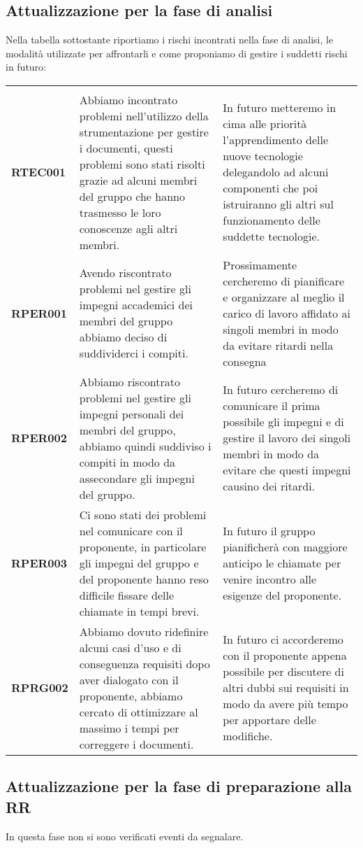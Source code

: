 \documentclass[../piano-di-progetto]{subfiles}
\begin{document}
\subsection{Attualizzazione per la fase di analisi}%
\label{sub:attualizzazione_fase_analisi}
Nella tabella sottostante riportiamo i rischi incontrati nella fase di analisi, le modalità utilizzate per affrontarli e come proponiamo di gestire i suddetti rischi in futuro:
\begin{table}[H]%
  \label{tab:registro_delle_modifiche}

  \centering

  \begin{longtable}[H]{|p{10em}|p{17em}|p{17em}|}
    \rowcolor{darkgray!90!}\color{white}{\textbf{Rischio}} & \color{white}{\textbf{Gestione}} & \color{white}{\textbf{Monitoraggio}} \\
    \textbf{RTEC001} & Abbiamo incontrato problemi nell'utilizzo della strumentazione per gestire i documenti, questi problemi sono stati risolti grazie ad alcuni membri del gruppo che hanno trasmesso le loro conoscenze agli altri membri. & In futuro metteremo in cima alle priorità l'apprendimento delle nuove tecnologie delegandolo ad alcuni componenti che poi istruiranno gli altri sul funzionamento delle suddette tecnologie.\\
    \textbf{RPER001} & Avendo riscontrato problemi nel gestire gli impegni accademici dei membri del gruppo abbiamo deciso di suddividerci i compiti. & Prossimamente cercheremo di pianificare e organizzare al meglio il carico di lavoro affidato ai singoli membri in modo da evitare ritardi nella consegna\\
    \textbf{RPER002} & Abbiamo riscontrato problemi nel gestire gli impegni personali dei membri del gruppo, abbiamo quindi suddiviso i compiti in modo da assecondare gli impegni del gruppo. & In futuro cercheremo di comunicare il prima possibile gli impegni e di gestire il lavoro dei singoli membri in modo da evitare che questi impegni causino dei ritardi.\\
    \textbf{RPER003} & Ci sono stati dei problemi nel comunicare con il proponente, in particolare gli impegni del gruppo e del proponente hanno reso difficile fissare delle chiamate in tempi brevi. & In futuro il gruppo pianificherà con maggiore anticipo le chiamate per venire incontro alle esigenze del proponente.\\
    \textbf{RPRG002} & Abbiamo dovuto ridefinire alcuni casi d'uso e di conseguenza requisiti dopo aver dialogato con il proponente, abbiamo cercato di ottimizzare al massimo i tempi per correggere i documenti. & In futuro ci accorderemo con il proponente appena possibile per discutere di altri dubbi sui requisiti in modo da avere più tempo per apportare delle modifiche.\\
    \hline %
  \end{longtable}
\end{table}
\subsection{Attualizzazione per la fase di preparazione alla RR}%
\label{sub:attualizzazione_fase_prep_RR}
In questa fase non si sono verificati eventi da segnalare.
\end{document}
